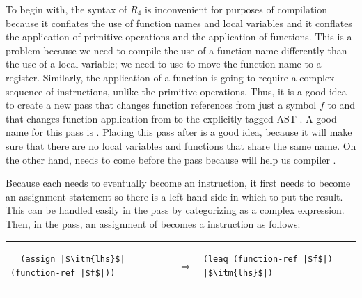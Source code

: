 \documentclass[11pt]{book}
\begin{document}
To begin with, the syntax of $R_4$ is inconvenient for purposes of
compilation because it conflates the use of function names and local
variables and it conflates the application of primitive operations and
the application of functions. This is a problem because we need to
compile the use of a function name differently than the use of a local
variable; we need to use  to move the function name to a
register. Similarly, the application of a function is going to require
a complex sequence of instructions, unlike the primitive
operations. Thus, it is a good idea to create a new pass that changes
function references from just a symbol $f$ to  and that changes function application from  to the explicitly tagged AST . A good name for this pass is
. Placing this pass after  is a
good idea, because it will make sure that there are no local variables
and functions that share the same name. On the other hand,
 needs to come before the  pass
because  will help us compiler .

Because each  needs to eventually become an
 instruction, it first needs to become an assignment
statement so there is a left-hand side in which to put the
result. This can be handled easily in the  pass by
categorizing  as a complex expression.  Then, in
the  pass, an assignment of
 becomes a  instruction as follows: \\
\begin{tabular}{lll}
\begin{minipage}{0.45\textwidth}
\begin{lstlisting}
  (assign |$\itm{lhs}$| (function-ref |$f$|))
\end{lstlisting}
\end{minipage}
&
$\Rightarrow$
&
\begin{minipage}{0.4\textwidth}
\begin{lstlisting}
(leaq (function-ref |$f$|) |$\itm{lhs}$|)
\end{lstlisting}
\end{minipage}
\end{tabular} 
\end{document}
